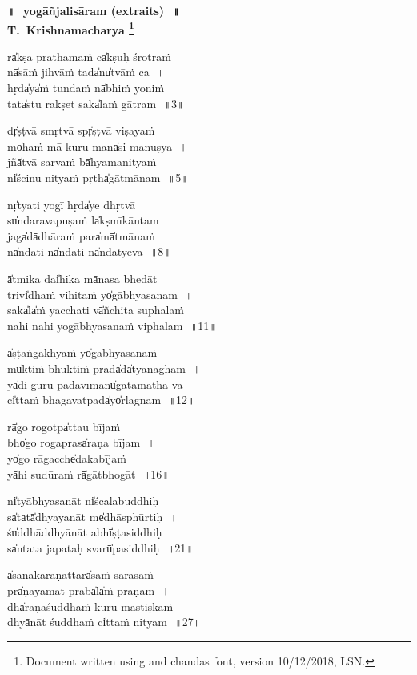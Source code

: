 \documentclass[parskip, DIV=14, pagenumber=head,top]{scrartcl}
\renewcommand{\thefootnote}{\fnsymbol{footnote}} %
\begin{document}

\vspace{-1.5cm}

\begin{center}
\textbf{{\Huge॥\,~yogāñjalisāram (extraits)\,~॥\\
\vspace{0.5cm}
\LARGE T.~Krishnamacharya
\LARGE\let\thefootnote\relax\footnote{\color{lightgray} Document written using \XeLaTeX{} and chandas font, version 10/12/2018, LSN.}}}
\end{center}
\Large

\centering	

ra̍kṣa prathamaṁ ca̍kṣuḥ śrotraṁ\\
nā̍sāṁ jihvāṁ ta॒da̍nu̍tvāṁ ca\,~।\\
hṛ॒da̍ya̍ṁ tundaṁ nā̍bhiṁ yoniṁ\\
ta॒ta̍stu rakṣet sa॒ka̍laṁ gātram\,~॥3॥

dṛ̍ṣṭvā smṛtvā spṛ̍ṣṭvā viṣayaṁ\\
mo̍haṁ mā kuru ma॒na̍si manuṣya\,~।\\
jñā̍tvā sarvaṁ bā̍hyamanityaṁ\\
ni̍ścinu nityaṁ pṛ॒tha̍gātmānam\,~॥5॥

nṛ̍tyati yogī hṛ॒da̍ye dhṛtvā\\
su̍ndaravapuṣaṁ la̍kṣmīkāntam\,~।\\
ja॒ga̍dā̍dhāraṁ pa॒ra̍mā̍tmānaṁ\\
na̍ndati na̍ndati na̍ndatyeva\,~॥8॥

ā̍tmika॒ dai̍hika॒ mā̍nasa bhedāt\\
tri॒vi̍dhaṁ vihitaṁ yo̍gābhyasanam\,~।\\
sa॒ka̍la̍ṁ yacchati vā̍ñchita suphalaṁ\\
na॒hi nahi yogābhya॒sanaṁ viphalam\,~॥11॥

a̍ṣṭāṅgākhyaṁ yo̍gābhyasanaṁ\\
mu̍ktiṁ bhuktiṁ pra॒da̍dā̍tyanaghām\,~।\\
ya̍di guru padavīma॒nu̍gatamatha vā\\
ci̍ttaṁ bhagavatpa॒da̍yo̍rlagnam\,~॥12॥

\newpage 
rā̍go rogotpa̍ttau bījaṁ\\
bho̍go rogapra॒sa̍raṇa bījam\,~।\\ 
yo̍go rāgacche̍dakabījaṁ\\
yā̍hi sudūraṁ rā̍gātbhogāt\,~॥16॥

ni̍tyābhyasanāt ni̍ścalabuddhiḥ\\
sa̍ta̍tā̍dhyayanāt me̍dhāsphūrtiḥ\,~।\\
śu̍ddhāddhyānāt a॒bhī̍ṣṭasiddhiḥ\\
sa̍ntata japataḥ sva॒rū̍pasiddhiḥ\,~॥21॥

ā̍sanakaraṇātta॒ra̍saṁ sarasaṁ\\
prā̍ṇāyāmāt pra॒ba̍la̍ṁ prāṇam\,~।\\
dhā̍raṇaśuddhaṁ kuru mastiṣkaṁ\\
dhyā̍nāt śuddhaṁ ci̍ttaṁ nityam\,~॥27॥
\end{document}
